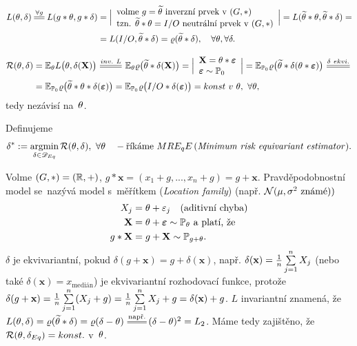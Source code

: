 \begin{dusl}
	\[
	\begin{split}
	L(\t,\delta)\equal{\forall g}L(g\ast\t,g\ast \delta)&=\Big| \begin{array}{l}
	\text{volme }g=\widetilde{\t}\text{ inverzní prvek v~}(G,\ast)\\\text{tzn. }\widetilde{\t}\ast\t=I/O\text{ neutrální prvek v~}(G,\ast)
	\end{array}
	\Big|=L(\widetilde{\t}\ast\t,\widetilde{\t}\ast\delta)=\\&=L(I/O,\widetilde{\t}\ast\delta)=\rho(\widetilde{\t}\ast\delta),\quad\forall\t,\forall\delta.
	\end{split}
	\] 
\end{dusl}
\begin{dusl}
	\[
	\begin{split}
	\RF(\t,\delta)&=\E_\t L\big(\t,\delta(\textbf{X})\big)\equal{inv.~L}\E_\t\rho\big(\widetilde{\t}\ast\delta(\textbf{X})\big)=\Big|\begin{array}{l}
	\textbf{X}=\t\ast\boldsymbol{\epsilon}\\\boldsymbol{\epsilon}\sim\PP_0	
	\end{array}
	\Big|=\E_{\PP_0}\rho\big(\widetilde{\t}\ast\delta(\t\ast\boldsymbol{\epsilon})\big)\equal{\delta~ekvi.}\\&=\E_{\PP_0}\rho\big(\widetilde{\t}\ast\t\ast\delta(\boldsymbol{\epsilon})\big)=\E_{\PP_0}\rho\big(I/O\ast\delta(\boldsymbol{\epsilon})\big)=konst~v~\t,~\forall\t,
	\end{split}
	\]
tedy nezávisí na~$\theta$.
\end{dusl}
\begin{define}
	Definujeme $$ \delta^\ast:=\mathop{\mathrm{argmin}}_{\delta\in\mathscr{D} _{Eq}}\mathcal{R}(\theta,\delta),~\forall\theta\quad-\text{říkáme }MRE_qE\,(\text{\textit{Minimum risk equivariant estimator}}).$$
\end{define}
\begin{example}
	Volme $(G,\ast)=(\mathbb{R},+)$, $g\ast\textbf{x}=(x_1+g,...,x_n+g)=g+\textbf{x}.$ Pravděpodobnostní model se~nazývá model s~měřítkem (\textit{Location family}) (např. $\mathcal{N}(\mu,\sigma^2 \text{ známé}))$
	\[
\begin{split}
X_j&=\theta+\varepsilon_j\quad(\text{aditivní chyba})\\
\textbf{X}&=\theta+\boldsymbol{\varepsilon}\sim\mathbb{P}_\theta\text{ a~platí, že }\\
g\ast \textbf{X}&=g+\textbf{X}\sim \mathbb{P}_{g+\theta}.
\end{split}
\]
	$\delta$ je ekvivariantní, pokud $\delta(g+\textbf{x})=g+\delta(\textbf{x})$, např. $\delta(\textbf{x})=\frac{1}{n}\sum\limits_{j=1}^{n} X_j$ (nebo také $\delta(\textbf{x})=x_{\text{medián}}$) je ekvivariantní rozhodovací funkce, protože $\delta(g+\textbf{x})=\frac{1}{n}\sum\limits_{j=1}^{n} (X_j+g)=\frac{1}{n}\sum\limits_{j=1}^{n} X_j + g=\delta(\textbf{x})+g$. $L$ invariantní znamená, že $L(\t,\delta)=\rho(\widetilde{\t}\ast\delta)=\rho(\delta-\t)\equal{\text{např.}}(\delta-\t)^2=L_2$. Máme tedy zajištěno, že $\mathcal{R}(\theta,\delta_{Eq})=konst.$ v~$\theta$.
\end{example}

